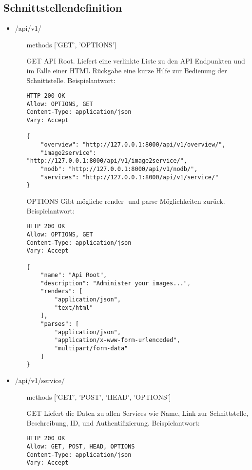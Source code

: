 \subsection{Schnittstellendefinition}
\begin{itemize}[align=parleft, labelsep=2cm, label={}, leftmargin=1cm]
	\item \textcolor{mypink1}{/api/v1/} 
	\begin{enumerate}[align=parleft, labelsep=*, leftmargin=*]
		\item[methods] ['GET', 'OPTIONS']
        \item[GET] API Root. Liefert eine verlinkte Liste zu den API Endpunkten und im Falle einer HTML Rückgabe eine kurze Hilfe zur Bedienung der Schnittstelle. Beispielantwort:
        \begin{verbatim}
HTTP 200 OK
Allow: OPTIONS, GET
Content-Type: application/json
Vary: Accept

{
    "overview": "http://127.0.0.1:8000/api/v1/overview/",
    "image2service": "http://127.0.0.1:8000/api/v1/image2service/",
    "nodb": "http://127.0.0.1:8000/api/v1/nodb/",
    "services": "http://127.0.0.1:8000/api/v1/service/"
}
\end{verbatim}
\item[OPTIONS] Gibt mögliche render- und parse Möglichkeiten zurück. Beispielantwort:
\begin{verbatim}
HTTP 200 OK
Allow: OPTIONS, GET
Content-Type: application/json
Vary: Accept

{
    "name": "Api Root",
    "description": "Administer your images...",
    "renders": [
        "application/json",
        "text/html"
    ],
    "parses": [
        "application/json",
        "application/x-www-form-urlencoded",
        "multipart/form-data"
    ]
}
        \end{verbatim}

	\end{enumerate}
    
 
    	\item \textcolor{mypink1}{/api/v1/service/} 
	\begin{enumerate}[align=parleft, labelsep=*, leftmargin=*]
		\item[methods] ['GET', 'POST', 'HEAD', 'OPTIONS']
        \item[GET] Liefert die Daten zu allen Services wie Name, Link zur Schnittstelle, Beschreibung, ID, und Authentifizierung. Beispielantwort:
                \begin{verbatim}
HTTP 200 OK
Allow: GET, POST, HEAD, OPTIONS
Content-Type: application/json
Vary: Accept


\end{verbatim}
\end{enumerate}
\end{itemize}
